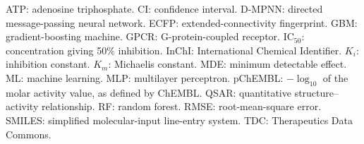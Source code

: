 {\sloppy
ATP: adenosine triphosphate.
CI: confidence interval.
D-MPNN: directed message-passing neural network.
ECFP: extended-connectivity fingerprint.
GBM: gradient-boosting machine.
GPCR: G-protein-coupled receptor.
$\mathrm{IC}_{50}$: concentration giving 50\% inhibition.
InChI: International Chemical Identifier.
$K_i$: inhibition constant.
$K_m$: Michaelis constant.
MDE: minimum detectable effect.
ML: machine learning.
MLP: multilayer perceptron.
pChEMBL: $-\log_{10}$ of the molar activity value, as defined by ChEMBL.
QSAR: quantitative structure--activity relationship.
RF: random forest.
RMSE: root-mean-square error.
SMILES: simplified molecular-input line-entry system.
TDC: Therapeutics Data Commons.
\par}
